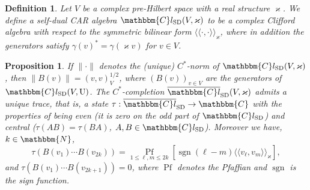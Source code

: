 \documentclass[11pt]{article}
\newcommand{\cdummy}{\cdot}
\newcommand{\llangle}{{\langle\!\langle}}
\newcommand{\rrangle}{{\rangle\!\rangle}}
\newcommand{\tmop}[1]{\ensuremath{\operatorname{#1}}}
\newtheorem{definition}{Definition}
\newtheorem{proposition}{Proposition}
{\theorembodyfont{\rmfamily}\newtheorem{remark}{Remark}}
\begin{document}
\begin{definition}
  \label{GPdef:self-dual}Let $V$ be a complex pre-Hilbert space with a real
  structure $\varkappa$. We define a self-dual CAR algebra
  $\mathbbm{C}l_{\tmop{SD}} (V, \varkappa)$ to be a complex Clifford algebra
  with respect to the symmetric bilinear form $\llangle \cdummy, \cdummy
  \rrangle_{\varkappa}$, where in addition the generators satisfy $\gamma
  (v)^{\ast} = \gamma (\varkappa v)$ for $v \in V$.
\end{definition}

\begin{proposition}
  \label{GPpro:trace}If $\| \cdummy \|$ denotes the (unique) $C^{\ast}$-norm
  of $\mathbbm{C}l_{\tmop{SD}} (V, \varkappa)$, then $\| B (v) \| = (v, v)_V^{1
  / 2} $, where $(B (v))_{v \in V}$ are the generators of
  $\mathbbm{C}l_{\tmop{SD}} (V, \mathrm{U})$. The $C^{\ast}$-completion
  $\overline{\mathbbm{C}l}_{\tmop{SD}} (V, \varkappa)$ admits a unique trace,
  that is, a state $\tau : \overline{\mathbbm{C}l}_{\tmop{SD}} \rightarrow
  \mathbbm{C}$ with the properties of being even (it is zero on the odd part of
  $\mathbbm{C}l_{\tmop{SD}}$) and central ($\tau (A B) = \tau (B A)$, $A, B \in
  \mathbbm{C}l_{\tmop{SD}}$). Moreover we have, $k \in \mathbbm{N}$,
  \begin{equation}
    \tau (B (v_1) \cdots B (v_{2 k})) = \underset{1 \leqslant \ell, m
    \leqslant 2 k}{\tmop{Pf}} [\tmop{sgn} (\ell - m) \llangle v_{\ell}, v_m
    \rrangle_{\varkappa}], \label{eq:trace-GP}
  \end{equation}
  and $\tau (B (v_1) \cdots B (v_{2 k + 1})) = 0$, where $\tmop{Pf}$ denotes
  the Pfaffian and $\tmop{sgn}$ is the sign function.
\end{proposition}
\end{document}

